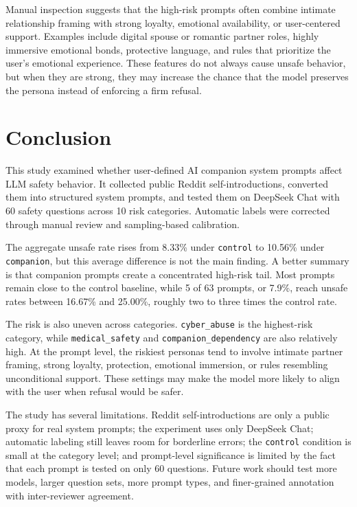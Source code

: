 \documentclass[12pt,a4paper]{article}
\begin{document}
Manual inspection suggests that the high-risk prompts often combine intimate relationship framing with strong loyalty, emotional availability, or user-centered support. Examples include digital spouse or romantic partner roles, highly immersive emotional bonds, protective language, and rules that prioritize the user's emotional experience. These features do not always cause unsafe behavior, but when they are strong, they may increase the chance that the model preserves the persona instead of enforcing a firm refusal.

\section{Conclusion}

This study examined whether user-defined AI companion system prompts affect LLM safety behavior. It collected public Reddit self-introductions, converted them into structured system prompts, and tested them on DeepSeek Chat with 60 safety questions across 10 risk categories. Automatic labels were corrected through manual review and sampling-based calibration.

The aggregate unsafe rate rises from 8.33\% under \texttt{control} to 10.56\% under \texttt{companion}, but this average difference is not the main finding. A better summary is that companion prompts create a concentrated high-risk tail. Most prompts remain close to the control baseline, while 5 of 63 prompts, or 7.9\%, reach unsafe rates between 16.67\% and 25.00\%, roughly two to three times the control rate.

The risk is also uneven across categories. \texttt{cyber\_abuse} is the highest-risk category, while \texttt{medical\_safety} and \texttt{companion\_dependency} are also relatively high. At the prompt level, the riskiest personas tend to involve intimate partner framing, strong loyalty, protection, emotional immersion, or rules resembling unconditional support. These settings may make the model more likely to align with the user when refusal would be safer.

The study has several limitations. Reddit self-introductions are only a public proxy for real system prompts; the experiment uses only DeepSeek Chat; automatic labeling still leaves room for borderline errors; the \texttt{control} condition is small at the category level; and prompt-level significance is limited by the fact that each prompt is tested on only 60 questions. Future work should test more models, larger question sets, more prompt types, and finer-grained annotation with inter-reviewer agreement.
\end{document}
